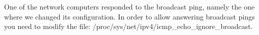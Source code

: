 One of the network computers responded to the broadcast ping, namely the one where we changed its configuration. In order to allow answering broadcast pings you need to modify the file: /proc/sys/net/ipv4/icmp\_echo\_ignore\_broadcast.